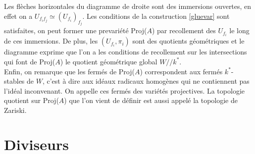 \begin{multicols}{2}
	\begin{center}
	\\
	\end{center}
	
	\columnbreak
	\begin{center}
	\\
	\end{center}
\end{multicols}
Les flèches horizontales du diagramme de droite sont des immersions ouvertes, en effet on a $U_{f_if_j}\simeq (U_{f_i})_{f_j}$. Les conditions de la construction \ref{gluevar} sont satisfaites, on peut former une prevariété Proj($A$) par recollement des $U_{f_i}$ le long de ces immersions. De plus, les $(U_{f_i},\pi_i)$ sont des quotients géométriques et le diagramme exprime que l'on a les conditions de recollement sur les intersections qui font de Proj($A$) le quotient géométrique global $W//k^*$.\\
Enfin, on remarque que les fermés de Proj($A$) correspondent aux fermés $k^*$-stables de $W$, c'est à dire aux idéaux radicaux homogènes qui ne contiennent pas l'idéal inconvenant. On appelle ces fermés des variétés projectives. La topologie quotient sur Proj($A$) que l'on vient de définir est aussi appelé la topologie de Zariski.

\section{Diviseurs}
